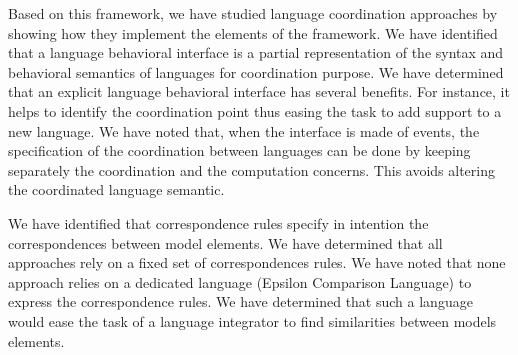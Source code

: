 Based on this framework, we have studied language coordination approaches by showing how they implement the elements of the framework. We have identified that a language behavioral interface is a partial representation of the syntax and behavioral semantics of languages for coordination purpose. We have determined that an explicit language behavioral interface has several benefits. For instance, it helps to identify the coordination point thus easing the task to add support to a new language. We have noted that, when the interface is made of events, the specification of the coordination between languages can be done by keeping separately the coordination and the computation concerns. This avoids altering the coordinated language semantic.


We have identified that correspondence rules specify in intention the correspondences between model elements. We have determined that all approaches rely on a fixed set of correspondences rules. We have noted that none approach relies on a dedicated language (\eg Epsilon Comparison Language) to express the correspondence rules. We have determined that such a language would ease the task of a language integrator to find similarities between models elements.  

